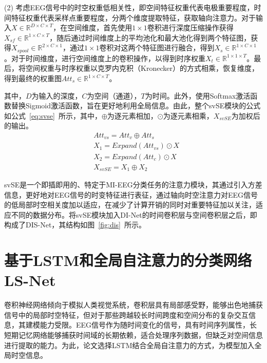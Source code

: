 (2) 考虑EEG信号中的时空权重低相关性，即空间特征权重代表电极重要程度，时间特征权重代表采样点重要程度，分两个维度提取特征，获取轴向注意力。对于输入\(X \in \mathbb{R}^{D \times C \times T}\)，在空间维度，首先使用\(1\times1\)卷积进行深度压缩操作获得\(X_{sf} \in \mathbb{R}^{1 \times C \times T}\)，随后通过时间维度上的平均池化和最大池化得到两个特征图，获得\(X_{spool} \in \mathbb{R}^{2 \times C \times 1}\)，通过\(1\times1\)卷积对这两个特征图进行融合，得到\(X_s \in \mathbb{R}^{1 \times C \times 1}\)。对于时间维度，进行空间维度上的卷积操作，以得到时序权重\(X_t \in \mathbb{R}^{1 \times 1 \times T}\)。最后，将空间权重与时序权重以克罗内克积（Kronecker）的方式相乘，恢复维度，得到最终的权重图\(Att_s \in \mathbb{R}^{1 \times C \times T}\)。

其中，\(D\)为输入的深度，\(C\)为空间（通道），\(T\)为时间。此外，使用Softmax激活函数替换Sigmoid激活函数，旨在更好地利用全局信息。由此，整个svSE模块的公式如公式~\ref{eq:svse}~所示，其中，\(\oplus\)为逐元素相加，\(\odot\)为逐元素相乘，\(X_{svSE}\)为加权后的输出。
\begin{equation}\label{eq:svse}
    \begin{aligned}
        &Att_{vs}=Att_v \oplus Att_s \\
        &X_1=Expand(Att_{vs}) \odot X \\
        &X_2=Expand(Att_c) \odot X \\
        &X_{svSE}=X_1 \oplus X_2
    \end{aligned}
\end{equation}

svSE是一个即插即用的、特定于MI-EEG分类任务的注意力模块，其通过引入方差信息，更好地对EEG信号的时变特征进行表征，通过轴向时空注意力对EEG信号的低局部时空相关度加以适应，在减少了计算开销的同时对重要特征加以关注，适应不同的数据分布。将svSE模块加入DI-Net的时间卷积层与空间卷积层之后，即构成了DIS-Net，其结构如图~\ref{fig:dis}~所示。


\section{基于LSTM和全局自注意力的分类网络LS-Net}

卷积神经网络倾向于模拟人类视觉系统，卷积层具有局部感受野，能够出色地捕获信号中的局部时空特征，但对于那些跨越较长时间跨度和空间分布的复杂交互信息，其建模能力受限。EEG信号作为随时间变化的信号，具有时间序列属性，长短期记忆网络能够捕获时间域的长期依赖，适合处理序列数据，但缺乏对空间信息进行提取的能力。为此，论文选择LSTM结合全局自注意力的方式，为模型加入全局时空信息。

